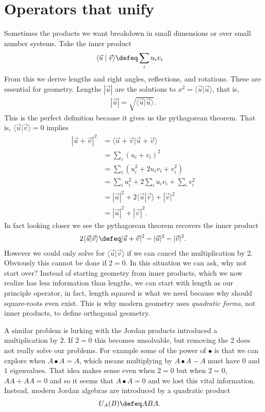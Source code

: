 
\section{Operators that unify}
Sometimes the products we want breakdown in small dimensions or over small number systems.
Take the inner product 
\begin{align*}
    \langle \vec{u}\mid \vec{v}\rangle & \defeq \sum_{i} u_i v_i
\end{align*}
From this we derive lengths and right angles, reflections, and rotations.
These are essential for geometry.
Lengths $|\vec{u}|$ are the solutions to $x^2=\langle \vec{u}|\vec{u}\rangle$, that is,
\begin{align*}
    |\vec{u}| = \sqrt{\langle \vec{u}|\vec{u}\rangle}.
\end{align*}
This is the perfect definition because it gives us the pythagorean theorem.
That is, $\langle \vec{u}|\vec{v}\rangle=0$ implies
\begin{align*}
    |\vec{u}+\vec{v}|^2 & = \langle \vec{u}+\vec{v}|\vec{u}+\vec{v}\rangle\\
    & = \sum_i (u_i+v_i)^2\\
    & = \sum_i (u_i^2+2u_i v_i+v_i^2)\\
    & = \sum_i u_i^2+2\sum_i u_i v_i + \sum_i v_i^2\\
    & = |\vec{u}|^2+2\langle \vec{u}|\vec{v}\rangle +|\vec{v}|^2\\
    & = |\vec{u}|^2+|\vec{v}|^2.
\end{align*}
In fact looking closer we see the pythagorean theorem recovers the inner product
\begin{align*}
    2\langle \vec{u}|\vec{v}\rangle \defeq  
        |\vec{u}+\vec{v}|^2-|\vec{u}|^2-|\vec{v}|^2.
\end{align*}
However we could only solve for $\langle \vec{u}|\vec{v}\rangle$ if we can 
cancel the multiplication by 2.    Obviously this cannot be done if $2=0$.
In this situation we can ask, why not start over?  Instead of starting geometry 
from inner products, which we now realize has less information than lengths,
we can start with length as our principle operator, in fact, length squared 
is what we need because why should square-roots even exist.  This is why 
modern geometry uses \emph{quadratic forms}, not inner products, to 
define orthogonal geometry.

A similar problem is lurking with  the Jordan products introduced a multiplication by $2$.
If $2=0$ this becomes unsolvable, but removing the 2 does not really solve 
our problems.  For example some of the power of $\bullet$ is that we 
can explore when $A\bullet A=A$, which means multiplying by $A\bullet A-A$ 
must have $0$ and $1$ eigenvalues.  That idea makes sense even when $2=0$ 
but when $2=0$, $AA+AA=0$ and so it seems that $A\bullet A=0$ and we lost 
this vital information.  Instead, modern Jordan algebras are introduced by 
a quadratic product 
\begin{align*}
    U_A(B) & \defeq ABA.
\end{align*}

